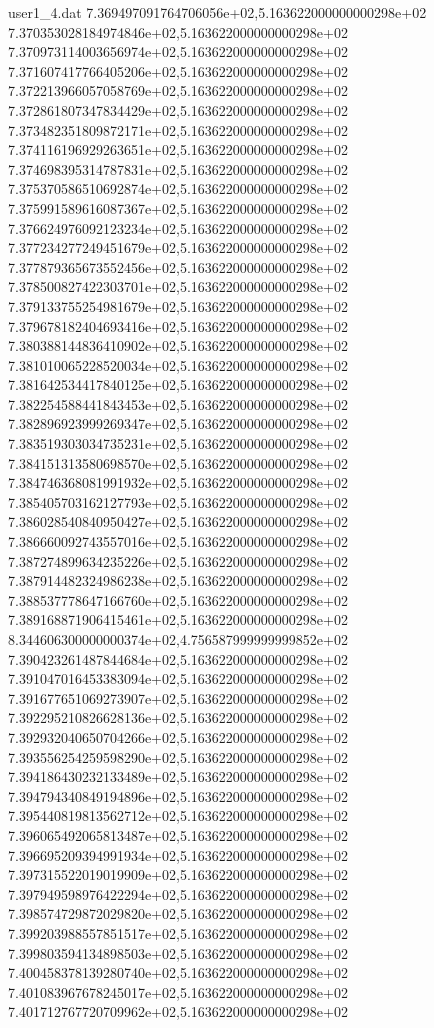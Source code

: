 \begin{filecontents}{user1_4.dat}
7.369497091764706056e+02,5.163622000000000298e+02
7.370353028184974846e+02,5.163622000000000298e+02
7.370973114003656974e+02,5.163622000000000298e+02
7.371607417766405206e+02,5.163622000000000298e+02
7.372213966057058769e+02,5.163622000000000298e+02
7.372861807347834429e+02,5.163622000000000298e+02
7.373482351809872171e+02,5.163622000000000298e+02
7.374116196929263651e+02,5.163622000000000298e+02
7.374698395314787831e+02,5.163622000000000298e+02
7.375370586510692874e+02,5.163622000000000298e+02
7.375991589616087367e+02,5.163622000000000298e+02
7.376624976092123234e+02,5.163622000000000298e+02
7.377234277249451679e+02,5.163622000000000298e+02
7.377879365673552456e+02,5.163622000000000298e+02
7.378500827422303701e+02,5.163622000000000298e+02
7.379133755254981679e+02,5.163622000000000298e+02
7.379678182404693416e+02,5.163622000000000298e+02
7.380388144836410902e+02,5.163622000000000298e+02
7.381010065228520034e+02,5.163622000000000298e+02
7.381642534417840125e+02,5.163622000000000298e+02
7.382254588441843453e+02,5.163622000000000298e+02
7.382896923999269347e+02,5.163622000000000298e+02
7.383519303034735231e+02,5.163622000000000298e+02
7.384151313580698570e+02,5.163622000000000298e+02
7.384746368081991932e+02,5.163622000000000298e+02
7.385405703162127793e+02,5.163622000000000298e+02
7.386028540840950427e+02,5.163622000000000298e+02
7.386660092743557016e+02,5.163622000000000298e+02
7.387274899634235226e+02,5.163622000000000298e+02
7.387914482324986238e+02,5.163622000000000298e+02
7.388537778647166760e+02,5.163622000000000298e+02
7.389168871906415461e+02,5.163622000000000298e+02
8.344606300000000374e+02,4.756587999999999852e+02
7.390423261487844684e+02,5.163622000000000298e+02
7.391047016453383094e+02,5.163622000000000298e+02
7.391677651069273907e+02,5.163622000000000298e+02
7.392295210826628136e+02,5.163622000000000298e+02
7.392932040650704266e+02,5.163622000000000298e+02
7.393556254259598290e+02,5.163622000000000298e+02
7.394186430232133489e+02,5.163622000000000298e+02
7.394794340849194896e+02,5.163622000000000298e+02
7.395440819813562712e+02,5.163622000000000298e+02
7.396065492065813487e+02,5.163622000000000298e+02
7.396695209394991934e+02,5.163622000000000298e+02
7.397315522019019909e+02,5.163622000000000298e+02
7.397949598976422294e+02,5.163622000000000298e+02
7.398574729872029820e+02,5.163622000000000298e+02
7.399203988557851517e+02,5.163622000000000298e+02
7.399803594134898503e+02,5.163622000000000298e+02
7.400458378139280740e+02,5.163622000000000298e+02
7.401083967678245017e+02,5.163622000000000298e+02
7.401712767720709962e+02,5.163622000000000298e+02

\end{filecontents}
